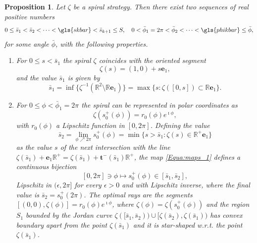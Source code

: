\documentclass[reqno]{amsart}
\theoremstyle{definition} \newtheorem{definition}{Definition}[section]
\theoremstyle{definition} \newtheorem{remark}[definition]{Remark}
\theoremstyle{plain} \newtheorem{lemma}[definition]{Lemma}
\theoremstyle{plain} \newtheorem{proposition}[definition]{Proposition}
\theoremstyle{plain} \newtheorem{theorem}[definition]{Theorem}
\theoremstyle{plain} \newtheorem{corollary}[definition]{Corollary}
\theoremstyle{definition} \newtheorem{example}[definition]{Example}
\theoremstyle{plain} \newtheorem{claim}[clai]{Claim}
\theoremstyle{definition} \newtheorem{assumption}[definition]{Assumption}
\theoremstyle{definition} \newtheorem{observation}[definition]{Observation}
\newcommand{\R}{\mathbb{R}}
\newcommand{\1}{\mathbbm 1}
\renewcommand{\i}{\imath}
\numberwithin{equation}{section} %
\theoremstyle{plain} \newtheorem*{theorem*}{Theorem}
\theoremstyle{plain} \newtheorem{mthm}[maintheorem]{Main Theorem}
\theoremstyle{plain} \newtheorem*{mthm*}{Main Theorem}
\theoremstyle{plain} \newtheorem*{conjecture*}{Conjecture}
\theoremstyle{plain} \newtheorem{conjecture}[definition]{Conjecture}
\theoremstyle{plain} \newtheorem*{problem*}{Problem}
\begin{document}
\begin{proposition}
\label{thm:param_1}
Let $\zeta$ be a spiral strategy. Then there exist two sequences of real positive numbers  
$$
0 \leq \bar s_1 < \bar s_2 < \dots < \gls{skbar} < \bar s_{k+1} \leq S, \quad 0 < \bar \phi_1 = 2\pi < \bar \phi_2 < \dots < \gls{phikbar} \leq \bar \phi,
$$
for some angle $\bar \phi$, with the following properties.

\begin{enumerate}
\item For $0 \leq s < \bar s_1$ the spiral $\zeta$ coincides with the oriented segment
\begin{equation*}
\zeta(s) = (1,0) + s \mathbf e_1,
\end{equation*}
and the value $\bar s_1$ is given by
\begin{equation*}
\bar s_1 = \inf \big\{ \zeta^{-1}(\R^2 \setminus \R \mathbf e_1) \big\} = \max \big\{ s : \zeta([0,s]) \subset \R \mathbf e_1 \big\}.
\end{equation*}

\item For $0 \leq \phi < \bar \phi_1 = 2\pi$ the spiral can be represented in polar coordinates as
\begin{equation}
\label{Equa:maps_1}
\zeta(s^+_0(\phi)) = r_0(\phi) e^{\i \phi}, %
\end{equation}
with $r_0(\phi)$ a Lipschitz function in $[0,2\pi]$. Defining the value
\begin{equation*}
\bar s_2 = \lim_{\phi \nearrow 2\pi} s^+_0(\phi) = \min \big\{ s > \bar s_1: \zeta(s) \in \R^+ \mathbf e_1 \big\} %
\end{equation*}
as the value $s$ of the next intersection with the line $\zeta(\bar s_1) + \mathbf e_1 \R^+ = \zeta(\bar s_1) + \mathbf t^-(\bar s_1) \R^+$, the map \eqref{Equa:maps_1} defines a continuous bijection
$$
[0,2\pi] \ni \phi \mapsto s^+_0(\phi) \in [\bar s_1,\bar s_2],
$$
Lipschitz in $(\epsilon,2\pi]$ for every $\epsilon > 0$ and with Lipschitz inverse, where the final value is $\bar s_2 = s_0^+(2\pi)$. 
The optimal rays are the segments $[(0,0),\zeta(\phi)] = r_0(\phi) e^{\i \phi}$, where $\zeta(\phi)=\zeta(s_0^+(\phi))$ and the region $S_1$ bounded by the Jordan curve $\zeta([\bar s_1,\bar s_2)) \cup [\zeta(\bar s_2),\zeta(\bar s_1))$ has convex boundary apart from the point $\zeta(\bar s_1)$ and it is star-shaped w.r.t. the point $\zeta(\bar s_1)$.


\end{enumerate}
\end{proposition}
\end{document}
